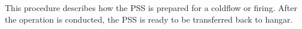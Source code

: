 This procedure describes how the PSS is prepared for a coldflow or firing. After the operation is conducted, the PSS is ready to be transferred back to hangar. 